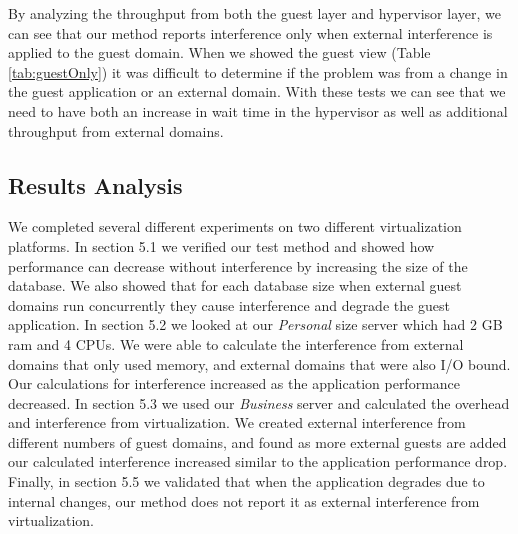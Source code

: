 By analyzing the throughput from both the guest layer and hypervisor layer, we can see that our method reports interference only when external interference is applied to the guest domain.  When we showed the guest view (Table \ref{tab:guestOnly}) it was difficult to determine if the problem was from a change in the guest application or an external domain.  With these tests we can see that we need to have both an increase in wait time in the hypervisor as well as additional throughput from external domains.


\subsection{Results Analysis}
We completed several different experiments on two different virtualization platforms.  In section 5.1 we verified our test method and showed how performance can decrease without interference by increasing the size of the database.  We also showed that for each database size when external guest domains run concurrently they cause interference and degrade the guest application.  In section 5.2 we looked at our \emph{Personal} size server which had 2 GB ram and 4 CPUs.  We were able to calculate the interference from external domains that only used memory, and external domains that were also I/O bound.  Our calculations for interference increased as the application performance decreased.  In section 5.3 we used our \emph{Business} server and calculated the overhead and interference from virtualization.  We created external interference from different numbers of guest domains, and found as more external guests are added our calculated interference increased similar to the application performance drop.  Finally, in section 5.5 we validated that when the application degrades due to internal changes, our method does not report it as external interference from virtualization.



